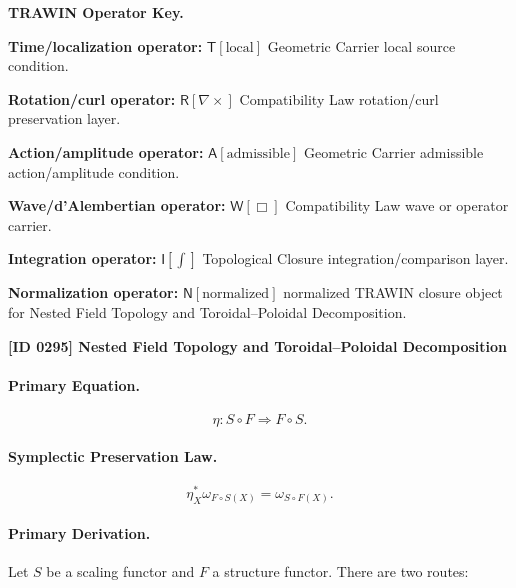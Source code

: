 \par\vspace{0.45\baselineskip}
\noindent\begin{minipage}[t]{\linewidth}
\begingroup
\small
\raggedright
\textbf{TRAWIN Operator Key.}\par
\noindent\textbf{Time/localization operator:} $\mathsf{T}\!\left[\mathrm{local}\right]$ Geometric Carrier local source condition.\par
\noindent\textbf{Rotation/curl operator:} $\mathsf{R}\!\left[\nabla\times\right]$ Compatibility Law rotation/curl preservation layer.\par
\noindent\textbf{Action/amplitude operator:} $\mathsf{A}\!\left[\mathrm{admissible}\right]$ Geometric Carrier admissible action/amplitude condition.\par
\noindent\textbf{Wave/d'Alembertian operator:} $\mathsf{W}\!\left[\Box\right]$ Compatibility Law wave or operator carrier.\par
\noindent\textbf{Integration operator:} $\mathsf{I}\!\left[\int\right]$ Topological Closure integration/comparison layer.\par
\noindent\textbf{Normalization operator:} $\mathsf{N}\!\left[\mathrm{normalized}\right]$ normalized TRAWIN closure object for Nested Field Topology and Toroidal--Poloidal Decomposition.\par
\endgroup
\end{minipage}

\clearpage
\noindent\textbf{[ID 0295] Nested Field Topology and Toroidal--Poloidal Decomposition}\par
\vspace{0.35em}
\paragraph{Primary Equation.}
\begin{equation}
\eta:S\circ F\Rightarrow F\circ S.
\end{equation}

\paragraph{Symplectic Preservation Law.}
\begin{equation}
\eta_X^{*}\omega_{F\circ S(X)}
=
\omega_{S\circ F(X)}.
\end{equation}

\paragraph{Primary Derivation.}
Let $S$ be a scaling functor and $F$ a structure functor.  
There are two routes:

